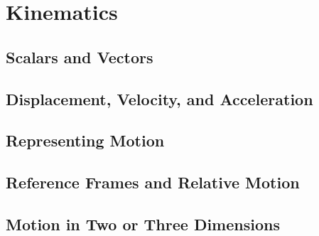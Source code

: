 \documentclass[../mech.tex]{subfiles}
\begin{document}
\chapter{Kinematics}
\section{Scalars and Vectors}
\section{Displacement, Velocity, and Acceleration}
\section{Representing Motion}
\section{Reference Frames and Relative Motion}
\section{Motion in Two or Three Dimensions}
\end{document}
